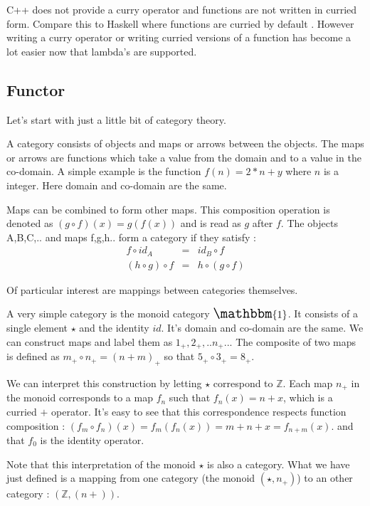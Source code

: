 \documentclass[12pt,fleqn]{article}
\begin{document}
C++ does not provide a curry operator and functions are not written in curried form. 
Compare this to Haskell where functions are curried by default \cite{lipovaca, hutton}.
However writing a curry operator or writing curried versions of a function has become a lot easier now that lambda's are supported.



%
%
\subsection{Functor}
%
%
%
Let's start with just a little bit of category theory.

A category consists of objects and maps or arrows between the objects.
The maps or arrows are functions which take a value from the domain and to a value in the co-domain. A simple example is the function $f(n) = 2*n + y$ 
where $n$ is a integer. Here domain and co-domain are the same.

Maps can be combined to form other maps.
This composition operation is denoted as $(g \circ f)(x) = g(f(x))$ and is read as $g$ after $f$.
The  objects A,B,C,.. and maps f,g,h.. form a category if they satisfy :
\begin{eqnarray*}
f \circ id_{A} &=& id_{B} \circ f \\
(h \circ g) \circ f &=& h \circ (g \circ f)
\end{eqnarray*}

Of particular interest are mappings between categories themselves.

A very simple category is the monoid category $\Large \mathbbm{1}$.
It consists of a single element $\star$ and the identity $id$.
It's domain and co-domain are the same.
We can construct maps and label them as $1_+, 2_+,..n_+..$.
The composite of two maps is defined as $m_+ \circ n_+ = (n+m)_+$ so that $5_+ \circ 3_+ = 8_+$.

We can interpret this construction by letting $\star$ correspond to $\mathbb{Z}$.
Each map $n_+$ in the monoid corresponds to a map $f_n$ such that $f_{n}(x) = n + x$, which is a curried $+$ operator. 
It's easy to see that this correspondence respects function composition : $(f_m \circ f_n) (x) = f_m(f_n(x)) = m + n + x = f_{n+m}(x)$.
and that $f_0$ is the identity operator.

Note that this interpretation of the monoid $\star$ is also a category. 
What we have just defined is a mapping from one category (the monoid $(\star, n_+)$) to an other category : $(\mathbb{Z}, (n +))$.
\end{document}
